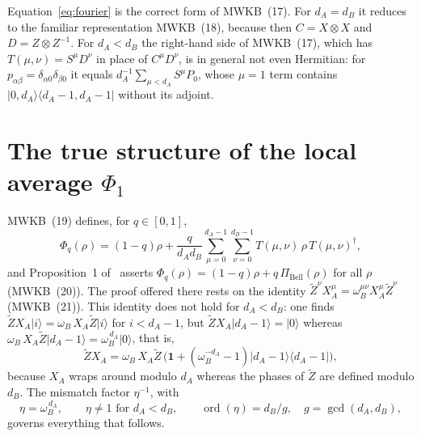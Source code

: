\documentclass[11pt,a4paper]{article}
\theoremstyle{definition}
\theoremstyle{remark}
\newcommand{\ket}[1]{\lvert #1\rangle}
\newcommand{\ketbra}[2]{\lvert #1\rangle\langle #2\rvert}
\newcommand{\dA}{d_A}
\newcommand{\dB}{d_B}
\newcommand{\wB}{\omega_B}
\newcommand{\PiB}{\Pi_{\mathrm{Bell}}}
\newcommand{\id}{\mathbf{1}}
\begin{document}
Equation~\eqref{eq:fourier} is the correct form of MWKB~(17). For $\dA=\dB$ it reduces to
the familiar representation MWKB~(18), because then $C=X\otimes X$ and $D=Z\otimes Z^{-1}$.
For $\dA<\dB$ the right-hand side of MWKB~(17), which has $T(\mu,\nu)=S^\mu D^\nu$ in place
of $C^\mu D^\nu$, is in general not even Hermitian: for $p_{\alpha\beta}=\delta_{\alpha0}\delta_{\beta0}$
it equals $\dA^{-1}\sum_{\mu<\dA}S^{\mu}P_0$, whose $\mu=1$ term contains
$\ketbra{0,\dA}{\dA-1,\dA-1}$ without its adjoint.

\section{The true structure of the local average \texorpdfstring{$\Phi_1$}{Phi1}}

MWKB~(19) defines, for $q\in[0,1]$,
\begin{equation}\label{eq:Phi}
\Phi_q(\rho)=(1-q)\rho+\frac{q}{\dA\dB}\sum_{\mu=0}^{\dA-1}\sum_{\nu=0}^{\dB-1}
T(\mu,\nu)\,\rho\,T(\mu,\nu)^{\dagger},
\end{equation}
and Proposition~1 of~\cite{MWKB24} asserts
$\Phi_q(\rho)=(1-q)\rho+q\,\PiB(\rho)$ for all $\rho$ (MWKB~(20)). The proof offered there
rests on the identity $\tilde Z^{\nu}X_A^{\mu}=\wB^{\mu\nu}X_A^{\mu}\tilde Z^{\nu}$
(MWKB~(21)). This identity does not hold for $\dA<\dB$: one finds
$\tilde Z X_A\ket{i}=\wB\,X_A\tilde Z\ket{i}$ for $i<\dA-1$, but
$\tilde Z X_A\ket{\dA-1}=\ket{0}$ whereas
$\wB\,X_A\tilde Z\ket{\dA-1}=\wB^{\,\dA}\ket{0}$, that is,
\begin{equation}\label{eq:mismatch}
\tilde Z X_A=\wB\,X_A\tilde Z\,\bigl(\id+(\wB^{-\dA}-1)\ketbra{\dA-1}{\dA-1}\bigr),
\end{equation}
because $X_A$ wraps around modulo $\dA$ whereas the phases of $\tilde Z$ are defined
modulo $\dB$. The mismatch factor $\eta^{-1}$, with
\begin{equation}\label{eq:eta}
\eta=\wB^{\,\dA},\qquad \eta\neq1 \text{ for } \dA<\dB,\qquad
\operatorname{ord}(\eta)=\dB/g,\quad g=\gcd(\dA,\dB),
\end{equation}
governs everything that follows.
\end{document}
